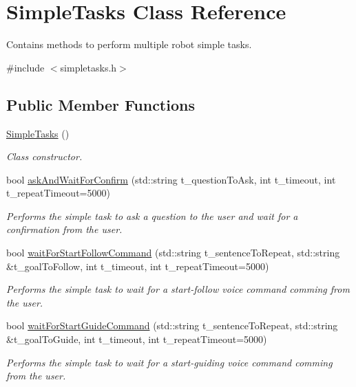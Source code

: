 \hypertarget{class_simple_tasks}{}\section{Simple\+Tasks Class Reference}
\label{class_simple_tasks}


Contains methods to perform multiple robot simple tasks.  




{\ttfamily \#include $<$simpletasks.\+h$>$}

\subsection*{Public Member Functions}
\begin{DoxyCompactItemize}
\item 
\hyperlink{class_simple_tasks_a2c01b91079593cf7be1a217d35326afb}{Simple\+Tasks} ()
\begin{DoxyCompactList}\small\item\em Class constructor. \end{DoxyCompactList}\item 
bool \hyperlink{class_simple_tasks_ac72035a3f58ac7103cb8ae73666dfd06}{ask\+And\+Wait\+For\+Confirm} (std\+::string t\+\_\+question\+To\+Ask, int t\+\_\+timeout, int t\+\_\+repeat\+Timeout=5000)
\begin{DoxyCompactList}\small\item\em Performs the simple task to ask a question to the user and wait for a confirmation from the user. \end{DoxyCompactList}\item 
bool \hyperlink{class_simple_tasks_af7a9088f0d7c9158b90e7c6c7bc57f93}{wait\+For\+Start\+Follow\+Command} (std\+::string t\+\_\+sentence\+To\+Repeat, std\+::string \&t\+\_\+goal\+To\+Follow, int t\+\_\+timeout, int t\+\_\+repeat\+Timeout=5000)
\begin{DoxyCompactList}\small\item\em Performs the simple task to wait for a start-\/follow voice command comming from the user. \end{DoxyCompactList}\item 
bool \hyperlink{class_simple_tasks_a7a1383e20af5750c86310b2e563a7cdf}{wait\+For\+Start\+Guide\+Command} (std\+::string t\+\_\+sentence\+To\+Repeat, std\+::string \&t\+\_\+goal\+To\+Guide, int t\+\_\+timeout, int t\+\_\+repeat\+Timeout=5000)
\begin{DoxyCompactList}\small\item\em Performs the simple task to wait for a start-\/guiding voice command comming from the user. \end{DoxyCompactList}\item 

\end{DoxyCompactItemize}
